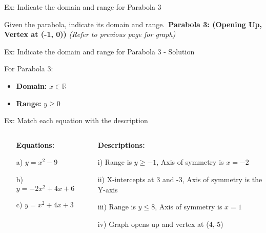 \documentclass[aspectratio=169]{beamer}
\begin{document}
\begin{frame}{Ex: Indicate the domain and range for Parabola 3}
    \begin{tcolorbox}[colback=lightgray,colframe=primary,title=Problem]
        \footnotesize
        Given the parabola, indicate its domain and range.\
        \textbf{Parabola 3: (Opening Up, Vertex at (-1, 0))}
        \textit{(Refer to previous page for graph)}
    \end{tcolorbox}
\end{frame}

\begin{frame}{Ex: Indicate the domain and range for Parabola 3 - Solution}
    \begin{tcolorbox}[colback=lightgray,colframe=accent,title=Detailed Solution]
        \footnotesize
        For Parabola 3:\
        \begin{itemize}
            \item \textbf{Domain:} $x \in \mathbb{R}$
            \item \textbf{Range:} $y \ge 0$
        \end{itemize}
    \end{tcolorbox}
\end{frame}

\begin{frame}{Ex: Match each equation with the description}
    \begin{tcolorbox}[colback=lightgray,colframe=primary,title=Match the following]
        \footnotesize
        \begin{columns}
            \begin{column}{0.5\textwidth}
                \begin{itemize}
                    \item[] \textbf{Equations:}
                    \item[a)] $y = x^2 - 9$
                    \item[b)] $y = -2x^2 + 4x + 6$
                    \item[c)] $y = x^2 + 4x + 3$
                \end{itemize}
            \end{column}
            \begin{column}{0.5\textwidth}
                \begin{itemize}
                    \item[] \textbf{Descriptions:}
                    \item[i)] Range is $y \ge -1$, Axis of symmetry is $x = -2$
                    \item[ii)] X-intercepts at 3 and -3, Axis of symmetry is the Y-axis
                    \item[iii)] Range is $y \le 8$, Axis of symmetry is $x = 1$
                    \item[iv)] Graph opens up and vertex at (4,-5)
                \end{itemize}
            \end{column}
        \end{columns}
    \end{tcolorbox}
\end{frame}
\end{document}
